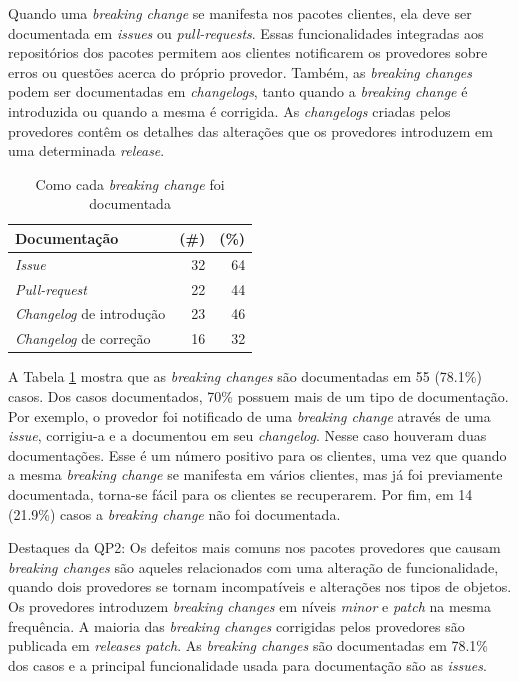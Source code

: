 Quando uma \textit{breaking change} se manifesta nos pacotes clientes, ela deve ser documentada em \textit{issues} ou \textit{pull-requests}. Essas funcionalidades integradas aos repositórios dos pacotes permitem aos clientes notificarem os provedores sobre erros ou questões acerca do próprio provedor. Também, as \textit{breaking changes} podem ser documentadas em \textit{changelogs}, tanto quando a \textit{breaking change} é introduzida ou quando a mesma é corrigida. As \textit{changelogs} criadas pelos provedores contêm os detalhes das alterações que os provedores introduzem em uma determinada \textit{release}.

\begin{table}
	\centering
	\caption{Como cada \textit{breaking change} foi documentada}
	\begin{tabular}{lrr}
		\toprule
		\textbf{Documentação} & \textbf{(\#)} & \textbf{(\%)}   \\ \hline
		\textit{Issue}        & 32            & 64              \\
		\textit{Pull-request} & 22            & 44              \\
		\textit{Changelog} de introdução & 23 & 46              \\
		\textit{Changelog} de correção   & 16 & 32              \\ %
		\bottomrule
	\end{tabular}
	\label{tab:bc_documentation}
\end{table}

A Tabela \ref{tab:bc_documentation} mostra que as \textit{breaking changes} são documentadas em 55 (78.1\%) casos. Dos casos documentados, 70\% possuem mais de um tipo de documentação. Por exemplo, o provedor foi notificado de uma \textit{breaking change} através de uma \textit{issue}, corrigiu-a e a documentou em seu \textit{changelog}. Nesse caso houveram duas documentações. Esse é um número positivo para os clientes, uma vez que quando a mesma \textit{breaking change} se manifesta em vários clientes, mas já foi previamente documentada, torna-se fácil para os clientes se recuperarem. Por fim, em 14 (21.9\%) casos a \textit{breaking change} não foi documentada.

\begin{mdframed}
Destaques da QP2: Os defeitos mais comuns nos pacotes provedores que causam \textit{breaking changes} são aqueles relacionados com uma alteração de funcionalidade, quando dois provedores se tornam incompatíveis e alterações nos tipos de objetos. Os provedores introduzem \textit{breaking changes} em níveis \textit{minor} e \textit{patch} na mesma frequência. A maioria das \textit{breaking changes} corrigidas pelos provedores são publicada em \textit{releases patch}. As \textit{breaking changes} são documentadas em 78.1\% dos casos e a principal funcionalidade usada para documentação são as \textit{issues}.
\end{mdframed}